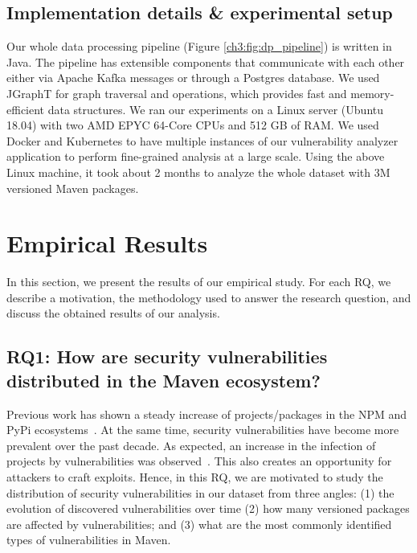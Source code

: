 \subsection{Implementation details \& experimental setup}
Our whole data processing pipeline (Figure \ref{ch3:fig:dp_pipeline}) is written in Java.
The pipeline has extensible components that communicate with each other either via Apache Kafka messages or through a Postgres database.
We used JGraphT for graph traversal and operations, which provides fast and memory-efficient data structures.
We ran our experiments on a Linux server (Ubuntu 18.04) with two AMD EPYC 64-Core CPUs and 512 GB of RAM. We used Docker and Kubernetes to have multiple instances of our vulnerability analyzer application to perform fine-grained analysis at a large scale. Using the above Linux machine, it took about 2 months to analyze the whole dataset with 3M versioned Maven packages.

\newpage
\section{Empirical Results}\label{ch3:sec:empirical-results}
In this section, we present the results of our empirical study. For each RQ, we describe a motivation, the methodology used to answer the research question, and discuss the obtained results of our analysis.

\subsection{\textbf{RQ1}: How are security vulnerabilities distributed in the Maven ecosystem?}

Previous work has shown a steady increase of projects/packages in the NPM and PyPi ecosystems~\cite{decan2018impact,alfadel2021empirical}. At the same time, security vulnerabilities have become more prevalent over the past decade. As expected, an increase in the infection of projects by vulnerabilities was observed~\cite{alfadel2021empirical}. This also creates an opportunity for attackers to craft exploits. Hence, in this RQ, we are motivated to study the distribution of security vulnerabilities in our dataset from three angles: (1) the evolution of discovered vulnerabilities over time (2) how many versioned packages are affected by vulnerabilities; and (3) what are the most commonly identified types of vulnerabilities in Maven.

